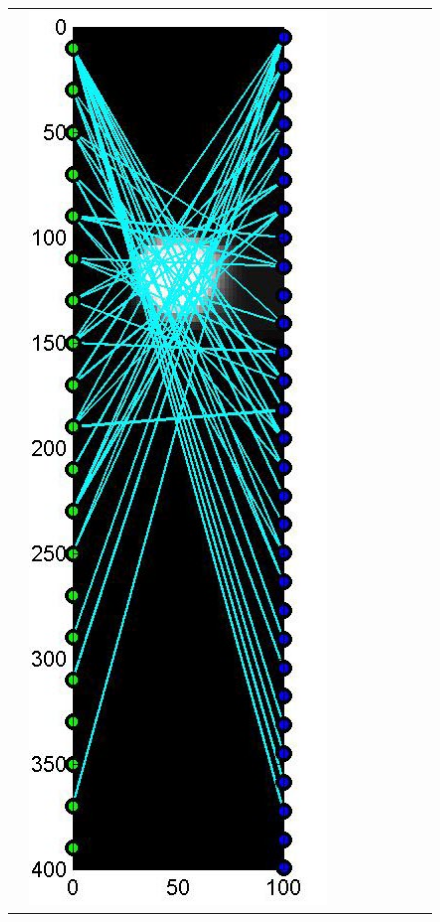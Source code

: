 \documentclass[11pt]{article}
\begin{document}
\begin{figure}[!h]
\begin{center}
\begin{tabular}{|c|c|c|c|c|c|c|c|c|}
			&
			\includegraphics[width=.9\iwidth]{figures/newFigs/noisy/resultsExp-2-designs}
			&

\end{tabular}
\end{center}
\end{figure}
\end{document}

